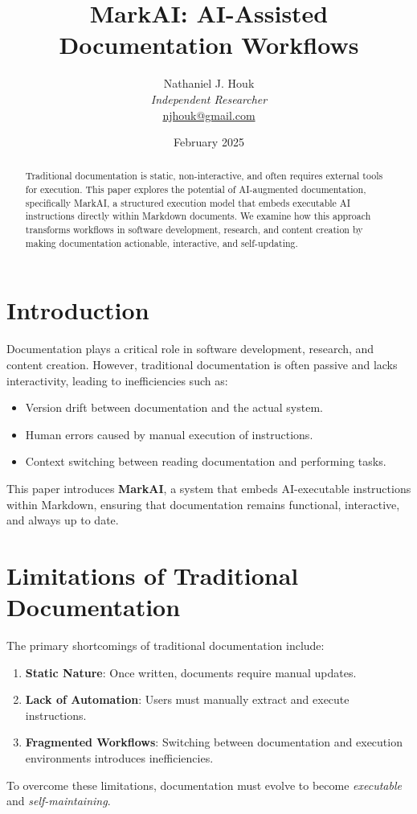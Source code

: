 \documentclass{article}
\title{MarkAI: AI-Assisted Documentation Workflows}
\author{Nathaniel J. Houk\\
\textit{Independent Researcher}\\
\href{mailto:njhouk@gmail.com}{njhouk@gmail.com}}
\date{February 2025}
\begin{document}
\maketitle
\tableofcontents

\begin{abstract}
Traditional documentation is static, non-interactive, and often requires external tools for execution. This paper explores the potential of AI-augmented documentation, specifically MarkAI, a structured execution model that embeds executable AI instructions directly within Markdown documents. We examine how this approach transforms workflows in software development, research, and content creation by making documentation actionable, interactive, and self-updating.
\end{abstract}

\section{Introduction}
Documentation plays a critical role in software development, research, and content creation. However, traditional documentation is often passive and lacks interactivity, leading to inefficiencies such as:
\begin{itemize}
    \item Version drift between documentation and the actual system.
    \item Human errors caused by manual execution of instructions.
    \item Context switching between reading documentation and performing tasks.
\end{itemize}
This paper introduces \textbf{MarkAI}, a system that embeds AI-executable instructions within Markdown, ensuring that documentation remains functional, interactive, and always up to date.

\section{Limitations of Traditional Documentation}
The primary shortcomings of traditional documentation include:
\begin{enumerate}
    \item \textbf{Static Nature}: Once written, documents require manual updates.
    \item \textbf{Lack of Automation}: Users must manually extract and execute instructions.
    \item \textbf{Fragmented Workflows}: Switching between documentation and execution environments introduces inefficiencies.
\end{enumerate}
To overcome these limitations, documentation must evolve to become \textit{executable} and \textit{self-maintaining}.
\end{document}
